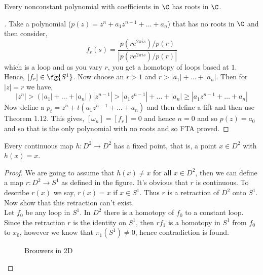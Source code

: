 \begin{nthm}[FTA]
  Every nonconstant polynomial with coefficients in $\C$ has roots in $\C$.
\end{nthm}
\begin{proof}[]
  Take a polynomial ($p(z) = z^n + a_1z^{n-1} + \dots + a_n$) that has no roots in $\C$ and then consider,
  $$ f_r(s) = \frac{p(re^{2\pi is})/p(r)}{|p(re^{2\pi is})/p(r)|} $$
  which is a loop and as you vary $r$, you get a homotopy of loops based at $1$. Hence, $[f_r] \in \fg {S^1}$. Now choose an $r > 1$ and $r > |a_1| + \dots + |a_n|$. Then for $|z| = r$ we have,
  $$ |z^n| > (|a_1| + \dots + |a_n|)|z^{n-1}| > |a_1z^{n-1}| + \dots + |a_n| \ge |a_1z^{n-1} + \dots + a_n| $$
  Now define a $p_t = z^n + t(a_1z^{n-1} + \dots + a_n)$ and then define a lift and then use Theorem 1.12. This gives, $[\omega_n] = [f_r] = 0$ and hence $n = 0$ and so $p(z) = a_0$ and so that is the only polynomial with no roots and so FTA proved.
\end{proof}

\begin{nthm}
  Every continuous map $h : D^2 \to D^2$ has a fixed point, that is, a point $x \in D^2$ with $h(x) = x$.
\end{nthm}
\begin{proof}
  We are going to assume that $h(x) \neq x$ for all $x \in D^2$, then we can define a map $r : D^2 \to S^1$ as defined in the figure. It's obvious that $r$ is continuous. To describe $r(x)$ we say, $r(x) = x$ if $x \in S^1$. Thus $r$ is a retraction of $D^2$ onto $S^1$. Now show that this retraction can't exist.\\
  Let $f_0$ be any loop in $S^1$. In $D^2$ there is a homotopy of $f_0$ to a constant loop. Since the retraction $r$ is the identity on $S^1$, then $rf_1$ is a homotopy in $S^1$ from $f_0$ to $x_0$, however we know that $\pi_1(S^1) \ne 0$, hence contradiction is found.
  \begin{figure}[!ht]
  \centering
  \caption{Brouwers in 2D}
  \end{figure}
  \end{proof}

